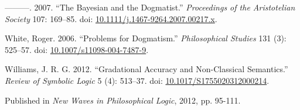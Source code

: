 \documentclass[
  11pt,
  letterpaper,
  DIV=11,
  numbers=noendperiod,
  twoside]{scrartcl}
\newlength{\cslhangindent}
\newenvironment{CSLReferences}[2] %
 {\begin{list}{}{%
  \setlength{\itemindent}{0pt}
  \setlength{\leftmargin}{0pt}
  \setlength{\parsep}{0pt}
  \ifodd #1
   \setlength{\leftmargin}{\cslhangindent}
   \setlength{\itemindent}{-1\cslhangindent}
  \fi
  \setlength{\itemsep}{#2\baselineskip}}}
 {\end{list}}
\begin{document}
\begin{CSLReferences}{1}{0}
---------. 2007. {``The Bayesian and the Dogmatist.''} \emph{Proceedings
of the Aristotelian Society} 107: 169--85. doi:
\href{https://doi.org/10.1111/j.1467-9264.2007.00217.x}{10.1111/j.1467-9264.2007.00217.x}.

White, Roger. 2006. {``Problems for Dogmatism.''} \emph{Philosophical
Studies} 131 (3): 525--57. doi:
\href{https://doi.org/10.1007/s11098-004-7487-9}{10.1007/s11098-004-7487-9}.

Williams, J. R. G. 2012. {``Gradational Accuracy and Non-Classical
Semantics.''} \emph{Review of Symbolic Logic} 5 (4): 513--37. doi:
\href{https://doi.org/10.1017/S1755020312000214}{10.1017/S1755020312000214}.

\end{CSLReferences}



\noindent Published in\emph{
New Waves in Philosophical Logic}, 2012, pp. 95-111.
\end{document}
